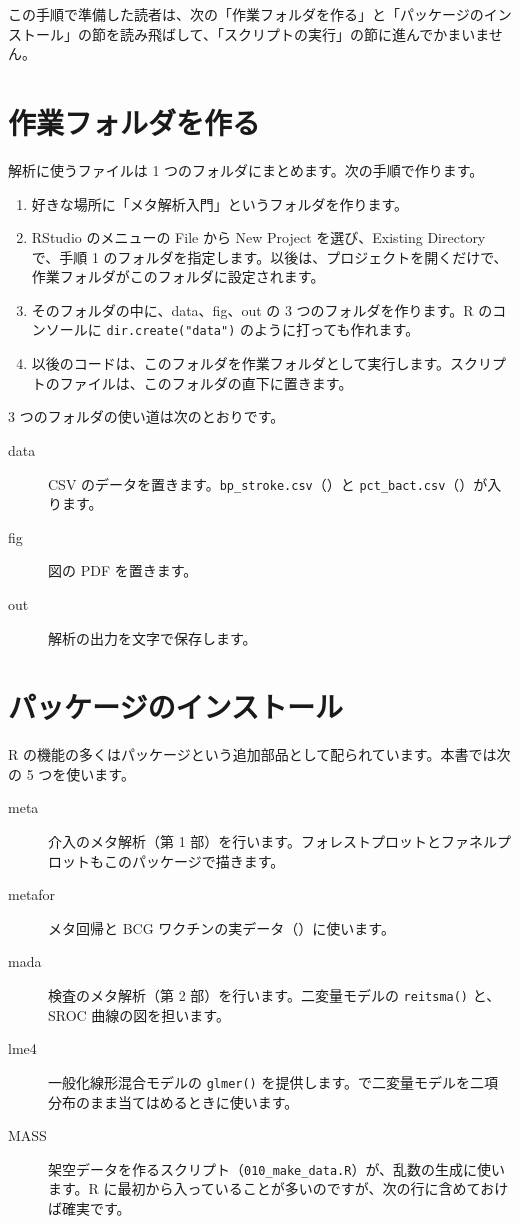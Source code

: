 この手順で準備した読者は、次の「作業フォルダを作る」と「パッケージのインストール」の節を読み飛ばして、「スクリプトの実行」の節に進んでかまいません。

\section{作業フォルダを作る}
\label{sec:A-3}

解析に使うファイルは 1 つのフォルダにまとめます。次の手順で作ります。
\begin{enumerate}
\item 好きな場所に「メタ解析入門」というフォルダを作ります。
\item RStudio のメニューの File から New Project を選び、Existing Directory で、手順 1 のフォルダを指定します。以後は、プロジェクトを開くだけで、作業フォルダがこのフォルダに設定されます。
\item そのフォルダの中に、data、fig、out の 3 つのフォルダを作ります。R のコンソールに \texttt{dir.create("data")} のように打っても作れます。
\item 以後のコードは、このフォルダを作業フォルダとして実行します。スクリプトのファイルは、このフォルダの直下に置きます。
\end{enumerate}

3 つのフォルダの使い道は次のとおりです。
\begin{description}
\item[data] CSV のデータを置きます。\texttt{bp\_stroke.csv}（）と \texttt{pct\_bact.csv}（）が入ります。
\item[fig] 図の PDF を置きます。
\item[out] 解析の出力を文字で保存します。
\end{description}

\section{パッケージのインストール}
\label{sec:A-4}

R の機能の多くはパッケージという追加部品として配られています。本書では次の 5 つを使います。
\begin{description}
\item[meta] 介入のメタ解析（第 1 部）を行います。フォレストプロットとファネルプロットもこのパッケージで描きます。
\item[metafor] メタ回帰と BCG ワクチンの実データ（）に使います。
\item[mada] 検査のメタ解析（第 2 部）を行います。二変量モデルの \texttt{reitsma()} と、SROC 曲線の図を担います。
\item[lme4] 一般化線形混合モデルの \texttt{glmer()} を提供します。で二変量モデルを二項分布のまま当てはめるときに使います。
\item[MASS] 架空データを作るスクリプト（\texttt{010\_make\_data.R}）が、乱数の生成に使います。R に最初から入っていることが多いのですが、次の行に含めておけば確実です。
\end{description}

